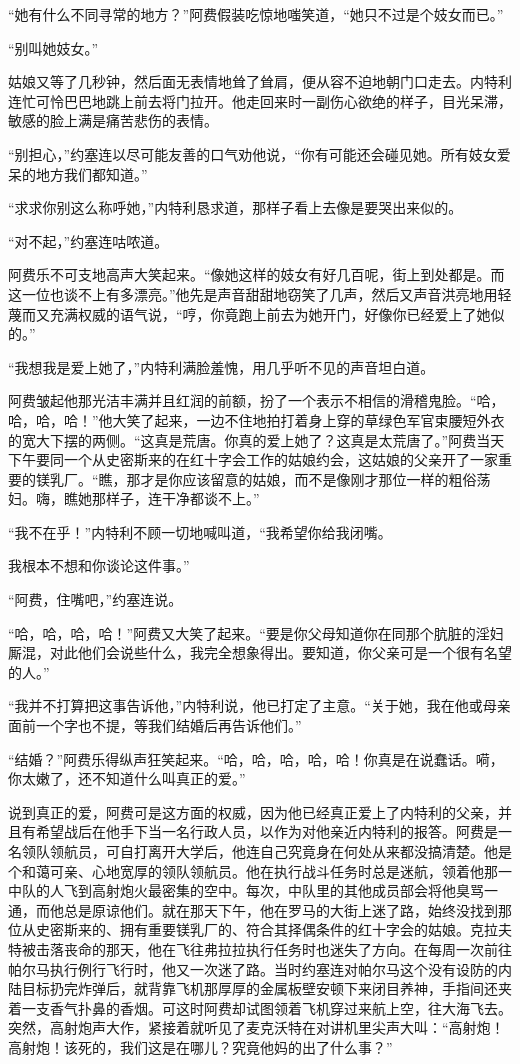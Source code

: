     “她有什么不同寻常的地方？”阿费假装吃惊地嗤笑道，“她只不过是个妓女而已。”

    “别叫她妓女。”

    姑娘又等了几秒钟，然后面无表情地耸了耸肩，便从容不迫地朝门口走去。内特利连忙可怜巴巴地跳上前去将门拉开。他走回来时一副伤心欲绝的样子，目光呆滞，敏感的脸上满是痛苦悲伤的表情。

    “别担心，”约塞连以尽可能友善的口气劝他说，“你有可能还会碰见她。所有妓女爱呆的地方我们都知道。”

    “求求你别这么称呼她，”内特利恳求道，那样子看上去像是要哭出来似的。

    “对不起，”约塞连咕哝道。

    阿费乐不可支地高声大笑起来。“像她这样的妓女有好几百呢，街上到处都是。而这一位也谈不上有多漂亮。”他先是声音甜甜地窃笑了几声，然后又声音洪亮地用轻蔑而又充满权威的语气说，“哼，你竟跑上前去为她开门，好像你已经爱上了她似的。”

    “我想我是爱上她了，”内特利满脸羞愧，用几乎听不见的声音坦白道。

    阿费皱起他那光洁丰满并且红润的前额，扮了一个表示不相信的滑稽鬼脸。“哈，哈，哈，哈！”他大笑了起来，一边不住地拍打着身上穿的草绿色军官束腰短外衣的宽大下摆的两侧。“这真是荒唐。你真的爱上她了？这真是太荒唐了。”阿费当天下午要同一个从史密斯来的在红十字会工作的姑娘约会，这姑娘的父亲开了一家重要的镁乳厂。“瞧，那才是你应该留意的姑娘，而不是像刚才那位一样的粗俗荡妇。嗨，瞧她那样子，连干净都谈不上。”

    “我不在乎！”内特利不顾一切地喊叫道，“我希望你给我闭嘴。

    我根本不想和你谈论这件事。”

    “阿费，住嘴吧，”约塞连说。

    “哈，哈，哈，哈！”阿费又大笑了起来。“要是你父母知道你在同那个肮脏的淫妇厮混，对此他们会说些什么，我完全想象得出。要知道，你父亲可是一个很有名望的人。”

    “我并不打算把这事告诉他，”内特利说，他已打定了主意。“关于她，我在他或母亲面前一个字也不提，等我们结婚后再告诉他们。”

 


    “结婚？”阿费乐得纵声狂笑起来。“哈，哈，哈，哈，哈！你真是在说蠢话。嗬，你太嫩了，还不知道什么叫真正的爱。”

    说到真正的爱，阿费可是这方面的权威，因为他已经真正爱上了内特利的父亲，并且有希望战后在他手下当一名行政人员，以作为对他亲近内特利的报答。阿费是一名领队领航员，可自打离开大学后，他连自己究竟身在何处从来都没搞清楚。他是个和蔼可亲、心地宽厚的领队领航员。他在执行战斗任务时总是迷航，领着他那一中队的人飞到高射炮火最密集的空中。每次，中队里的其他成员部会将他臭骂一通，而他总是原谅他们。就在那天下午，他在罗马的大街上迷了路，始终没找到那位从史密斯来的、拥有重要镁乳厂的、符合其择偶条件的红十字会的姑娘。克拉夫特被击落丧命的那天，他在飞往弗拉拉执行任务时也迷失了方向。在每周一次前往帕尔马执行例行飞行时，他又一次迷了路。当时约塞连对帕尔马这个没有设防的内陆目标扔完炸弹后，就背靠飞机那厚厚的金属板壁安顿下来闭目养神，手指间还夹着一支香气扑鼻的香烟。可这时阿费却试图领着飞机穿过来航上空，往大海飞去。突然，高射炮声大作，紧接着就听见了麦克沃特在对讲机里尖声大叫：“高射炮！高射炮！该死的，我们这是在哪儿？究竟他妈的出了什么事？”


